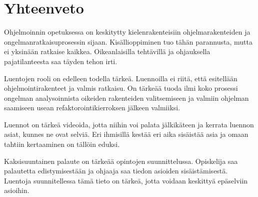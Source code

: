 \section{Yhteenveto}

Ohjelmoinnin opetuksessa on keskitytty kielenrakenteisiin ohjelmarakenteiden ja
ongelmanratkaisuprosessin sijaan. Kisällioppiminen tuo tähän parannusta, mutta
ei yksinään ratkaise kaikkea. Oikeanlaisilla tehtävillä ja ohjauksella
pajatilanteesta saa täyden tehon irti.

Luentojen rooli on edelleen todella tärkeä. Luennoilla ei riitä, että esitellään
ohjelmointirakenteet ja valmis ratkaisu. On tärkeää tuoda ilmi koko prosessi
ongelman analysoinnista oikeiden rakenteiden valitsemiseen ja valmiin ohjelman
saamiseen usean refaktorointikierroksen jälkeen valmiiksi.

Luennot on tärkeä videoida, jotta niihin voi palata jälkikäteen ja kerrata
luennon asiat, kunnes ne ovat selviä. Eri ihmisillä kestää eri aika sisäistää
asia ja omaan tahtiin kertaaminen on tällöin eduksi.

Kaksisuuntainen palaute on tärkeää opintojen suunnittelussa. Opiskelija saa
palautetta edistymisestään ja ohjaaja saa tiedon asioiden sisäistämisestä.
Luentoja suunnitellessa tämä tieto on tärkeä, jotta voidaan keskittyä epäselviin
asioihin.
